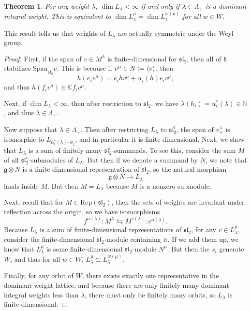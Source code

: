 \documentclass[leqno, openany]{memoir}
\newtheorem{thm}{Theorem}[section]
\theoremstyle{definition}
\theoremstyle{remark}
\theoremstyle{plain}
\theoremstyle{definition}
\theoremstyle{remark}
\newcommand{\N}{\mathbb{N}}
\newcommand{\C}{\mathbb{C}}
\newcommand{\g}{\mathfrak{g}}
\newcommand{\mf}[1]{\mathfrak{#1}}
\newcommand{\mr}[1]{\mathrm{#1}}
\begin{document}
\begin{thm}
    For any weight $\lambda$, $\dim L_{\lambda} < \infty$ if and only if $\lambda \in \Lambda_+$ is a dominant integral weight. This is equivalent to $\dim L_{\lambda}^{\mu} = \dim L_{\lambda}^{w(\mu)}$ for all $w \in W$.
\end{thm}

This result tells us that weights of $L_{\lambda}$ are actually symmetric under the Weyl group.

\begin{proof}
    First, if the span of $v \in M^{\lambda}$ is finite-dimensional for $\mf{sl}_2$, then all of $\mf{h}$ stabilizes $\mr{Span}_{\mf{sl}_2} v$. This is because if $v^{\mu} \in N \coloneqq \ev{v}$, then
    \[ h(e_i v^{\mu}) = e_i h v^{\mu} + \alpha_i(h) e_i v^{\mu}, \]
    and thus $h(f_i v^{\mu}) \in \C f_i v^{\mu}$.

    Next, if $\dim L_{\lambda} < \infty$, then after restriction to $\mf{sl}_2$, we have $\lambda(h_i) = \alpha_i^*(\lambda) \in \N$, and thus $\lambda \in \Lambda_+$.

    Now suppose that $\lambda \in \Lambda_+$. Then after restricting $L_{\lambda}$ to $\mf{sl}_2^i$, the span of $v_+^{\lambda}$ is isomorphic to $L_{\alpha_i^* (\lambda) \cdot \phi_1}$, and in particular it is finite-dimensional. Next, we show that $L_{\lambda}$ is a sum of finitely many $\mf{sl}_2^i$-summands. To see this, consider the sum $M$ of all $\mf{sl}_2^i$-submodules of $L_{\lambda}$. But then if we denote a summand by $N$, we note that $\g \otimes N$ is a finite-dimensional representation of $\mf{sl}_2$, so the natural morphism
    \[ \g \otimes N \to L_{\lambda} \]
    lands inside $M$. But then $M = L_{\lambda}$ because $M$ is a nonzero submodule.

    Next, recall that for $M \in \mr{Rep}(\mf{sl}_2)$, then the sets of weights are invariant under reflection across the origin, so we have isomorphisms
    \[ f^{\alpha(\lambda)} \colon M^{\lambda} \leftrightarrows M^{s(\lambda)} \colon e^{\alpha(\lambda)}. \]
    Because $L_{\lambda}$ is a sum of finite-dimensional representations of $\mf{sl}_2$, for any $v \in L_{\lambda}^{\mu}$, consider the finite-dimensional $\mf{sl}_2$-module containing it. If we add them up, we know that $L_{\lambda}^{\mu}$ is some finite-dimensional $\mf{sl}_2$-module $N^{\mu}$. But then the $s_i$ generate $W$, and thus for all $w \in W$, $L_{\lambda}^{\mu} \cong L_{\lambda}^{w(\mu)}$.

    Finally, for any orbit of $W$, there exists exactly one representative in the dominant weight lattice, and because there are only finitely many dominant integral weights less than $\lambda$, there must only be finitely many orbits, so $L_{\lambda}$ is finite-dimensional.
\end{proof}
\end{document}
